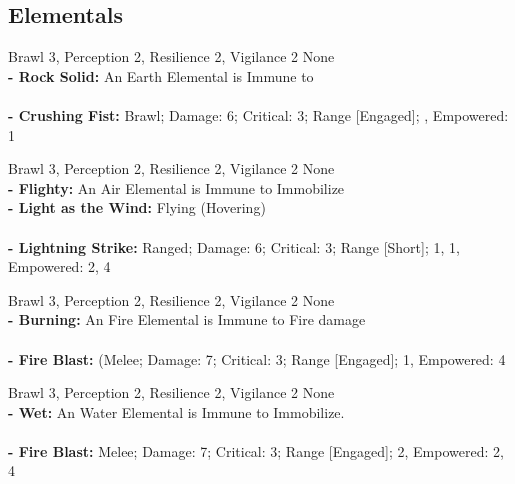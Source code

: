 \subsection{Elementals}

\Creature[name=Minor Earth Elemental, type=Rival, summon=true, brawn=3, agility=2, presence=0, soak=4, wounds=14, meleedef=0, rangeddef=0, magicdef=1, psionicdef=0]{
} {
    Brawl 3, Perception 2, Resilience 2, Vigilance 2
}{
    None
}{
    \\ %
    \textbf{- Rock Solid:} An Earth Elemental is Immune to \\
}{
    \\ %
    \textbf{- Crushing Fist:} Brawl; Damage: 6; Critical: 3; Range [Engaged]; , Empowered: 1\\
}

\Creature[name=Minor Air Elemental, type=Rival, summon=true, brawn=2, agility=3, presence=0, soak=4, wounds=12, meleedef=1, rangeddef=1, magicdef=1, psionicdef=0]{
} {
    Brawl 3, Perception 2, Resilience 2, Vigilance 2
}{
    None
}{
    \\ %
    \textbf{- Flighty:} An Air Elemental is Immune to Immobilize\\
    \textbf{- Light as the Wind:} Flying (Hovering)\\
}{
    \\ %
    \textbf{- Lightning Strike:} Ranged; Damage: 6; Critical: 3; Range [Short];  1,  1, Empowered: 2,  4\\
}

\Creature[name=Minor Fire Elemental, type=Rival, summon=true, brawn=2, agility=2, presence=0, soak=4, wounds=12, meleedef=0, rangeddef=0, magicdef=1, psionicdef=0]{
} {
    Brawl 3, Perception 2, Resilience 2, Vigilance 2
}{
    None
}{
    \\ %
    \textbf{- Burning:} An Fire Elemental is Immune to Fire damage\\
}{
    \\ %
    \textbf{- Fire Blast:} (Melee; Damage: 7; Critical: 3; Range [Engaged];  1, Empowered: 4\\
}

\Creature[name=Minor Water Elemental, type=Rival, summon=true, brawn=2, agility=2, presence=0, soak=5, wounds=12, meleedef=1, rangeddef=1, magicdef=1, psionicdef=0]{
} {
    Brawl 3, Perception 2, Resilience 2, Vigilance 2
}{
    None
}{
    \\ %
    \textbf{- Wet:} An Water Elemental is Immune to Immobilize.\\
}{
    \\ %
    \textbf{- Fire Blast:} Melee; Damage: 7; Critical: 3; Range [Engaged];  2, Empowered: 2,  4\\
}
